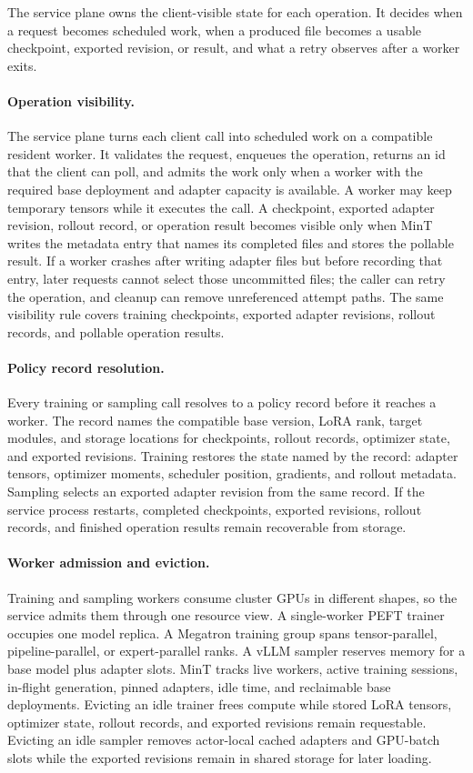 \documentclass{llmxive}
\begin{document}
The service plane owns the client-visible state for each operation. It decides when a request becomes scheduled work, when a produced file becomes a usable checkpoint, exported revision, or result, and what a retry observes after a worker exits.

\paragraph{Operation visibility.}
The service plane turns each client call into scheduled work on a compatible resident worker. It validates the request, enqueues the operation, returns an id that the client can poll, and admits the work only when a worker with the required base deployment and adapter capacity is available. A worker may keep temporary tensors while it executes the call. A checkpoint, exported adapter revision, rollout record, or operation result becomes visible only when MinT writes the metadata entry that names its completed files and stores the pollable result. If a worker crashes after writing adapter files but before recording that entry, later requests cannot select those uncommitted files; the caller can retry the operation, and cleanup can remove unreferenced attempt paths. The same visibility rule covers training checkpoints, exported adapter revisions, rollout records, and pollable operation results.

\paragraph{Policy record resolution.}
Every training or sampling call resolves to a policy record before it reaches a worker. The record names the compatible base version, LoRA rank, target modules, and storage locations for checkpoints, rollout records, optimizer state, and exported revisions. Training restores the state named by the record: adapter tensors, optimizer moments, scheduler position, gradients, and rollout metadata. Sampling selects an exported adapter revision from the same record. If the service process restarts, completed checkpoints, exported revisions, rollout records, and finished operation results remain recoverable from storage.

\paragraph{Worker admission and eviction.}
Training and sampling workers consume cluster GPUs in different shapes, so the service admits them through one resource view. A single-worker PEFT trainer occupies one model replica. A Megatron training group spans tensor-parallel, pipeline-parallel, or expert-parallel ranks. A vLLM sampler reserves memory for a base model plus adapter slots. MinT tracks live workers, active training sessions, in-flight generation, pinned adapters, idle time, and reclaimable base deployments. Evicting an idle trainer frees compute while stored LoRA tensors, optimizer state, rollout records, and exported revisions remain requestable. Evicting an idle sampler removes actor-local cached adapters and GPU-batch slots while the exported revisions remain in shared storage for later loading.
\end{document}
